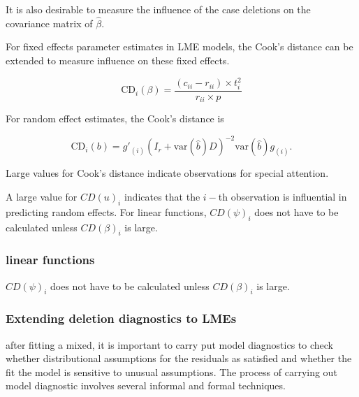 \documentclass[12pt, a4paper]{report}
\theoremstyle{plain}
\theoremstyle{definition}
\theoremstyle{remark}
\begin{document}
	
	
	It is also desirable to measure the influence of the case deletions on the covariance matrix of $\hat{\beta}$.
	
	For fixed effects parameter estimates in LME models, the  Cook's distance can be extended to measure influence on these fixed effects.
	
	\[
	\mbox{CD}_{i}(\beta) = \frac{(c_{ii} - r_{ii}) \times t^2_{i}}{r_{ii} \times p}
	\]

	
	For random effect estimates, the  Cook's distance is
	
	\[
	\mbox{CD}_{i}(b) = g{\prime}_{(i)} (I_{r} + \mbox{var}(\hat{b})D)^{-2}\mbox{var}(\hat{b})g_{(i)}.
	\]
	
	Large values for Cook's distance indicate observations for special attention.
	
	A large value for $CD(u)_i$ indicates that the $i-$th observation is influential in predicting random effects.
	For linear functions, $CD(\psi)_i$ does not have to be calculated unless $CD(\beta)_i$ is large.

	
	
	
	


	\subsubsection{linear functions}
	
	$CD(\psi)_i$ does not have to be calculated unless $CD(\beta)_i$ is large.
	

	
	
	
	
	
	
	
	
	
	
	

	\subsubsection{Extending deletion diagnostics to LMEs}
	after fitting a mixed, it is important to carry put model diagnostics to check whether distributional assumptions for the
	residuals as satisfied and whether the fit the model is sensitive to unusual assumptions. The process of carrying out model
	diagnostic involves several informal and formal techniques.
	
\end{document}
